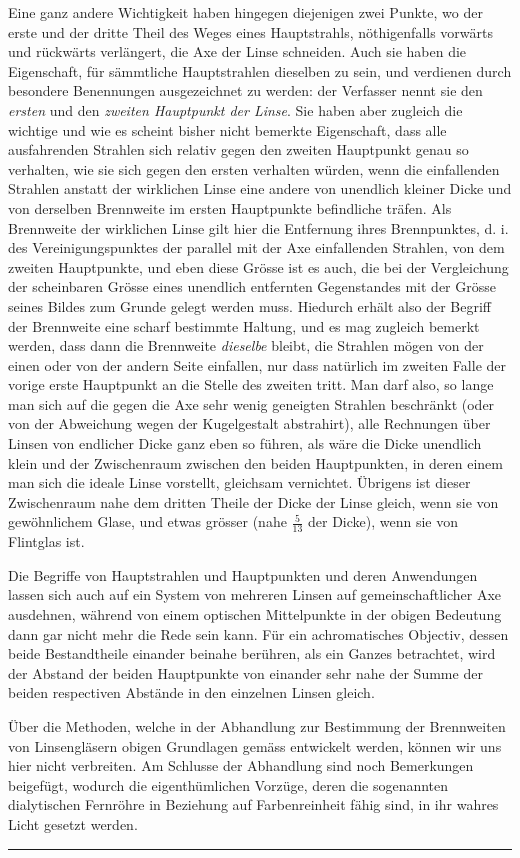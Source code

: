 Eine ganz andere Wichtigkeit haben hingegen diejenigen zwei Punkte, wo
der erste und der dritte Theil des Weges eines Hauptstrahls, nöthigenfalls vorwärts
und rückwärts verlängert, die Axe der Linse schneiden. Auch sie haben
die Eigenschaft, für sämmtliche Hauptstrahlen dieselben zu sein, und verdienen
durch besondere Benennungen ausgezeichnet zu werden: der Verfasser nennt sie
den \textit{ersten} und den \textit{zweiten Hauptpunkt der Linse}. Sie haben aber zugleich die
wichtige und wie es scheint bisher nicht bemerkte Eigenschaft, dass alle ausfahrenden
\clearpage
{}
\noindent
Strahlen sich relativ gegen den zweiten Hauptpunkt genau so verhalten,
wie sie sich gegen den ersten verhalten würden, wenn die einfallenden Strahlen
anstatt der wirklichen Linse eine andere von unendlich kleiner Dicke und von
derselben Brennweite im ersten Hauptpunkte befindliche träfen. Als Brennweite
der wirklichen Linse gilt hier die Entfernung ihres Brennpunktes, d. i. des Vereinigungspunktes
der parallel mit der Axe einfallenden Strahlen, von dem zweiten
Hauptpunkte, und eben diese Grösse ist es auch, die bei der Vergleichung der
scheinbaren Grösse eines unendlich entfernten Gegenstandes mit der Grösse
seines Bildes zum Grunde gelegt werden muss. Hiedurch erhält also der Begriff
der Brennweite eine scharf bestimmte Haltung, und es mag zugleich bemerkt
werden, dass dann die Brennweite \textit{dieselbe} bleibt, die Strahlen mögen von der
einen oder von der andern Seite einfallen, nur dass natürlich im zweiten Falle
der vorige erste Hauptpunkt an die Stelle des zweiten tritt. Man darf also,
so lange man sich auf die gegen die Axe sehr wenig geneigten Strahlen
beschränkt (oder von der Abweichung wegen der Kugelgestalt abstrahirt), alle
Rechnungen über Linsen von endlicher Dicke ganz eben so führen, als wäre
die Dicke unendlich klein und der Zwischenraum zwischen den beiden Hauptpunkten,
in deren einem man sich die ideale Linse vorstellt, gleichsam vernichtet.
Übrigens ist dieser Zwischenraum nahe dem dritten Theile der Dicke der Linse
gleich, wenn sie von gewöhnlichem Glase, und etwas grösser (nahe \(\frac{5}{13}\) der
Dicke), wenn sie von Flintglas ist.

Die Begriffe von Hauptstrahlen und Hauptpunkten und deren Anwendungen
lassen sich auch auf ein System von mehreren Linsen auf gemeinschaftlicher
Axe ausdehnen, während von einem optischen Mittelpunkte in der obigen Bedeutung
dann gar nicht mehr die Rede sein kann. Für ein achromatisches Objectiv,
dessen beide Bestandtheile einander beinahe berühren, als ein Ganzes betrachtet,
wird der Abstand der beiden Hauptpunkte von einander sehr nahe der Summe
der beiden respectiven Abstände in den einzelnen Linsen gleich.

Über die Methoden, welche in der Abhandlung zur Bestimmung der Brennweiten
von Linsengläsern obigen Grundlagen gemäss entwickelt werden, können
wir uns hier nicht verbreiten. Am Schlusse der Abhandlung sind noch Bemerkungen
beigefügt, wodurch die eigenthümlichen Vorzüge, deren die sogenannten
dialytischen Fernröhre in Beziehung auf Farbenreinheit fähig sind, in ihr wahres
Licht gesetzt werden.
\begin{center}\rule{.26\linewidth}{.4pt}\end{center}
